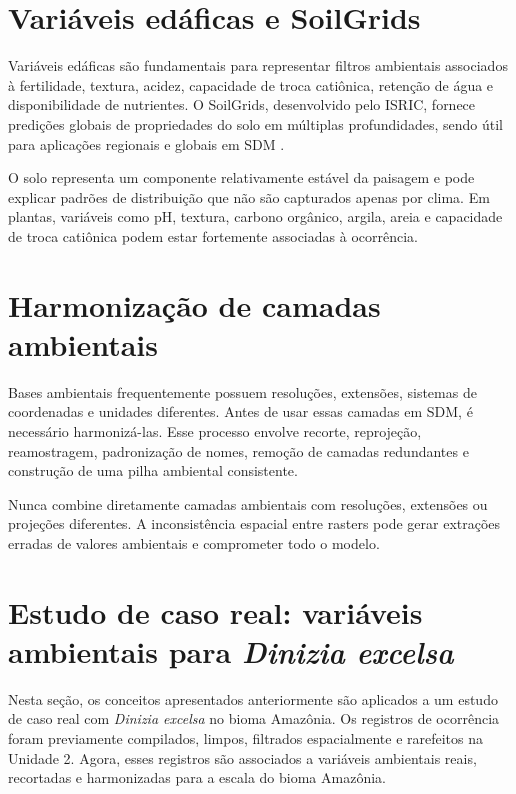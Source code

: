 \documentclass{ueap-sdm}
\begin{document}
\section{Variáveis edáficas e SoilGrids}

Variáveis edáficas são fundamentais para representar filtros ambientais associados à fertilidade, textura, acidez, capacidade de troca catiônica, retenção de água e disponibilidade de nutrientes. O SoilGrids, desenvolvido pelo ISRIC, fornece predições globais de propriedades do solo em múltiplas profundidades, sendo útil para aplicações regionais e globais em SDM \parencite{poggio2021soilgrids}.

\begin{conceito}[title={\faBook\quad Solo como filtro ecológico}]
	O solo representa um componente relativamente estável da paisagem e pode explicar padrões de distribuição que não são capturados apenas por clima. Em plantas, variáveis como pH, textura, carbono orgânico, argila, areia e capacidade de troca catiônica podem estar fortemente associadas à ocorrência.
\end{conceito}

\section{Harmonização de camadas ambientais}

Bases ambientais frequentemente possuem resoluções, extensões, sistemas de coordenadas e unidades diferentes. Antes de usar essas camadas em SDM, é necessário harmonizá-las. Esse processo envolve recorte, reprojeção, reamostragem, padronização de nomes, remoção de camadas redundantes e construção de uma pilha ambiental consistente.

\begin{atencao}[title={\faExclamationTriangle\quad Harmonização antes da modelagem}]
	Nunca combine diretamente camadas ambientais com resoluções, extensões ou projeções diferentes. A inconsistência espacial entre rasters pode gerar extrações erradas de valores ambientais e comprometer todo o modelo.
\end{atencao}

\section{Estudo de caso real: variáveis ambientais para \textit{Dinizia excelsa}}

Nesta seção, os conceitos apresentados anteriormente são aplicados a um estudo de caso real com \textit{Dinizia excelsa} no bioma Amazônia. Os registros de ocorrência foram previamente compilados, limpos, filtrados espacialmente e rarefeitos na Unidade 2. Agora, esses registros são associados a variáveis ambientais reais, recortadas e harmonizadas para a escala do bioma Amazônia.
\end{document}
